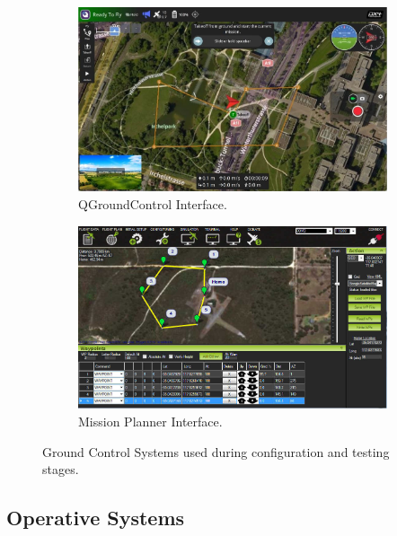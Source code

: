\begin{figure}[h!]
    \centering
    \begin{subfigure}{0.48\textwidth}
        \centering
        \includegraphics[width=\textwidth]{pictures/qgc_interface.jpg} %
        \caption{QGroundControl Interface.}
        \label{fig:qgc}
    \end{subfigure}
    \hfill
    \begin{subfigure}{0.48\textwidth}
        \centering
        \includegraphics[width=\textwidth]{pictures/mission_planner.jpg} %
        \caption{Mission Planner Interface.}
        \label{fig:mission_planner}
    \end{subfigure}
    \caption{Ground Control Systems used during configuration and testing stages.}
    \label{fig:gcs}
\end{figure}



\subsection{Operative Systems} 

